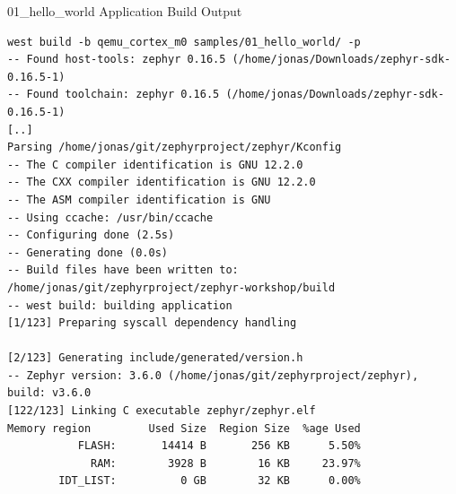 \documentclass[10pt, aspectratio=169]{beamer}
\begin{document}
\begin{frame}[fragile]{01\_hello\_world Application Build Output}
  \begin{listing}[H]
    \begin{verbatim}
west build -b qemu_cortex_m0 samples/01_hello_world/ -p
-- Found host-tools: zephyr 0.16.5 (/home/jonas/Downloads/zephyr-sdk-0.16.5-1)
-- Found toolchain: zephyr 0.16.5 (/home/jonas/Downloads/zephyr-sdk-0.16.5-1)
[..]
Parsing /home/jonas/git/zephyrproject/zephyr/Kconfig
-- The C compiler identification is GNU 12.2.0
-- The CXX compiler identification is GNU 12.2.0
-- The ASM compiler identification is GNU
-- Using ccache: /usr/bin/ccache
-- Configuring done (2.5s)
-- Generating done (0.0s)
-- Build files have been written to: /home/jonas/git/zephyrproject/zephyr-workshop/build
-- west build: building application
[1/123] Preparing syscall dependency handling

[2/123] Generating include/generated/version.h
-- Zephyr version: 3.6.0 (/home/jonas/git/zephyrproject/zephyr), build: v3.6.0
[122/123] Linking C executable zephyr/zephyr.elf
Memory region         Used Size  Region Size  %age Used
           FLASH:       14414 B       256 KB      5.50%
             RAM:        3928 B        16 KB     23.97%
        IDT_LIST:          0 GB        32 KB      0.00%
    \end{verbatim}
  \caption{\scriptsize{Console Output}}
  \end{listing}
\end{frame}
\end{document}
